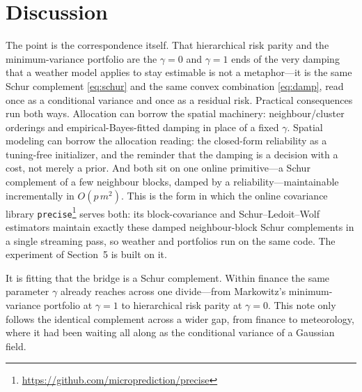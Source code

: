 \documentclass[11pt]{article}
\begin{document}
\section{Discussion}
The point is the correspondence itself. That hierarchical risk parity and the minimum-variance
portfolio are the $\gamma=0$ and $\gamma=1$ ends of the very damping that a weather model applies to
stay estimable is not a metaphor---it is the same Schur complement \eqref{eq:schur} and the same convex
combination \eqref{eq:damp}, read once as a conditional variance and once as a residual risk. Practical
consequences run both ways. Allocation can borrow the spatial machinery: neighbour/cluster orderings
and empirical-Bayes-fitted damping in place of a fixed $\gamma$. Spatial modeling can borrow the
allocation reading: the closed-form reliability as a tuning-free initializer, and the reminder that the
damping is a decision with a cost, not merely a prior. And both sit on one online primitive---a Schur
complement of a few neighbour blocks, damped by a reliability---maintainable incrementally in
$O(p\,m^2)$. This is the form in which the online covariance library
\texttt{precise}\footnote{\url{https://github.com/microprediction/precise}} serves both: its
block-covariance and Schur--Ledoit--Wolf estimators maintain exactly these damped neighbour-block Schur
complements in a single streaming pass, so weather and portfolios run on the same code. The experiment
of Section~5 is built on it.

It is fitting that the bridge is a Schur complement. Within finance the same parameter $\gamma$ already
reaches across one divide---from Markowitz's minimum-variance portfolio at $\gamma=1$ to hierarchical
risk parity at $\gamma=0$. This note only follows the identical complement across a wider gap, from
finance to meteorology, where it had been waiting all along as the conditional variance of a Gaussian
field.



\end{document}
